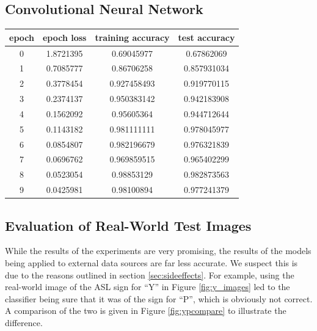 \documentclass[10pt,Times New Roman]{article}
\begin{document}
    \subsection{Convolutional Neural Network}
    \begin{center}
    \begin{tabular}{|c|c|c|c|}
        \hline
        epoch&        epoch loss&        training accuracy&        test accuracy\\
        \hline
        0&        1.8721395&        0.69045977&        0.67862069\\
        \hline
        1&        0.7085777&        0.86706258&        0.857931034\\
        \hline
        2&        0.3778454&        0.927458493&        0.919770115\\
        \hline
        3&        0.2374137&        0.950383142&        0.942183908\\
        \hline
        4&        0.1562092&        0.95605364&        0.944712644\\
        \hline
        5&        0.1143182&        0.981111111&        0.978045977\\
        \hline
        6&        0.0854807&        0.982196679&        0.976321839\\
        \hline
        7&        0.0696762&        0.969859515&        0.965402299\\
        \hline
        8&        0.0523054&        0.98853129&        0.982873563\\
        \hline
        9&        0.0425981&        0.98100894&        0.977241379\\
        \hline
    \end{tabular}
    \end{center}


    \subsection{Evaluation of Real-World Test Images}
        While the results of the experiments are very promising, the results of the models
        being applied to external data sources are far less accurate. We suspect this is due
        to the reasons outlined in section \ref{sec:sideeffects}. For example, using the
        real-world image of the ASL sign for ``Y'' in Figure \ref{fig:y_images} led to the classifier
        being sure that it was of the sign for ``P'', which is obviously not correct. A comparison
        of the two is given in Figure \ref{fig:ypcompare} to illustrate the difference.
\end{document}

